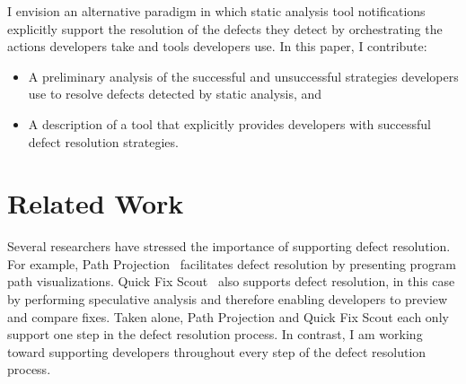 \documentclass{sig-alternate}
\newcommand{\compresslist}{
	\vspace{-.5em}
	\setlength{\itemsep}{1pt}
	\setlength{\parskip}{0pt}
	\setlength{\parsep}{0pt}
}
\begin{document}
I envision an alternative paradigm in which static analysis tool notifications explicitly support the resolution of the defects they detect by orchestrating the actions developers take and tools developers use.
In this paper, I contribute: 

\begin{itemize}
	\compresslist
	\item A preliminary analysis of the successful and unsuccessful strategies developers use to resolve defects detected by static analysis, and
	\item A description of a tool that explicitly provides developers with successful defect resolution strategies.
	
\end{itemize}



\section{Related Work}
\label{sec:rw}
Several researchers have stressed the importance of supporting defect resolution.
For example, Path Projection~\cite{Khoo2008} facilitates defect resolution by presenting program path visualizations. 
Quick Fix Scout~\cite{Muslu2012} also supports defect resolution, in this case by performing speculative analysis and therefore enabling developers to preview and compare fixes.
Taken alone, Path Projection and Quick Fix Scout each only support one step in the defect resolution process.
In contrast, I am working toward supporting developers throughout every step of the defect resolution process.
\end{document}
